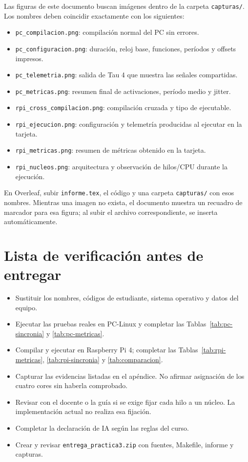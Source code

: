 \documentclass[12pt,a4paper]{article}
\begin{document}
Las figuras de este documento buscan imágenes dentro de la carpeta \texttt{capturas/}. Los nombres deben coincidir exactamente con los siguientes:
\begin{itemize}
  \item \texttt{pc\_compilacion.png}: compilación normal del PC sin errores.
  \item \texttt{pc\_configuracion.png}: duración, reloj base, funciones, períodos y offsets impresos.
  \item \texttt{pc\_telemetria.png}: salida de Tau 4 que muestra las señales compartidas.
  \item \texttt{pc\_metricas.png}: resumen final de activaciones, período medio y jitter.
  \item \texttt{rpi\_cross\_compilacion.png}: compilación cruzada y tipo de ejecutable.
  \item \texttt{rpi\_ejecucion.png}: configuración y telemetría producidas al ejecutar en la tarjeta.
  \item \texttt{rpi\_metricas.png}: resumen de métricas obtenido en la tarjeta.
  \item \texttt{rpi\_nucleos.png}: arquitectura y observación de hilos/CPU durante la ejecución.
\end{itemize}

En Overleaf, subir \texttt{informe.tex}, el código y una carpeta \texttt{capturas/} con esos nombres. Mientras una imagen no exista, el documento muestra un recuadro de marcador para esa figura; al subir el archivo correspondiente, se inserta automáticamente.

\section{Lista de verificación antes de entregar}

\begin{itemize}
  \item Sustituir los nombres, códigos de estudiante, sistema operativo y datos del equipo.
  \item Ejecutar las pruebas reales en PC-Linux y completar las Tablas~\ref{tab:pc-sincronia} y \ref{tab:pc-metricas}.
  \item Compilar y ejecutar en Raspberry Pi 4; completar las Tablas~\ref{tab:rpi-metricas}, \ref{tab:rpi-sincronia} y \ref{tab:comparacion}.
  \item Capturar las evidencias listadas en el apéndice. No afirmar asignación de los cuatro cores sin haberla comprobado.
  \item Revisar con el docente o la guía si se exige fijar cada hilo a un núcleo. La implementación actual no realiza esa fijación.
  \item Completar la declaración de IA según las reglas del curso.
  \item Crear y revisar \texttt{entrega\_practica3.zip} con fuentes, Makefile, informe y capturas.
\end{itemize}
\end{document}
